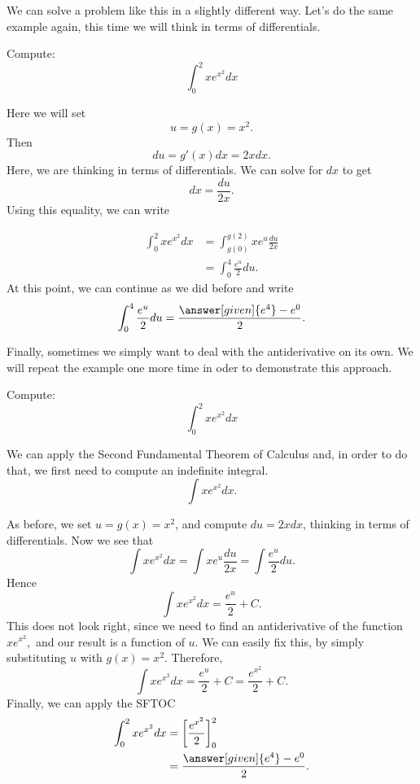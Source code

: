 \documentclass{ximera}
\begin{document}
We can solve a problem like this in a slightly different
way. Let's do the same example again, this time we will think in terms
of differentials.

\begin{example}\label{main example}
Compute:
\[
\int_0^2 x e^{x^2} dx
\]
\begin{explanation}
Here we will set
\[ u=g(x) = x^2.
\]
 Then 
 \[
 du =g'(x) dx=2x dx.
 \]
Here, we are thinking in terms of differentials.
We can solve for $dx$ to get 
\[
dx = \frac{du}{2x}.
\]
Using this equality, we can write

\begin{align*}
\int_0^2 x e^{x^2} dx &= \int_{g(0)}^{g(2)} x  e^{u} \frac{du}{2x}\\
  &= \int_{0}^{4} \frac{e^u}{2} du .
\end{align*}
At this point, we can continue as we did before and write
\[
 \int_{0}^{4} \frac{e^u}{2} du= \frac{\answer[given]{e^4} -e^0}{2}.
\]
\end{explanation}
\end{example}

Finally, sometimes we simply want to deal with the antiderivative on
its own.  We will repeat the example one more time in oder to demonstrate this approach.

\begin{example}
Compute:
\[
\int_0^2 x e^{x^2} dx
\]
\begin{explanation}
We can apply the Second Fundamental Theorem of Calculus and, in order to do that, we first need to compute an indefinite integral.
\[
\int  x e^{x^2}  dx.
\]

As before, we set $u=g(x)=x^2$, and compute $ du =  2x  dx$,
 thinking in terms of differentials. Now we see that
\[
\int   x e^{x^2} dx = \int x e^{u} \frac{du}{2x} = \int \frac{e^{u}}{2} du .
\]
Hence 
\[
\int  x e^{x^2} dx = \frac{e^{u}}{2}+C .
\]
This does not look right, since  we need to find an antiderivative of the function $ x e^{x^2},$ and our result is a function of $u$.
We can easily fix this, by simply substituting $u$ with $g(x)=x^2$.
Therefore,
\[
\int xe^{x^2} dx =\frac{e^{u}}{2}+C= \frac{e^{x^2}}{2}+C .
\]
Finally, we can apply the SFTOC
\begin{align*}
\int_0^2 x e^{x^2} dx &=\bigg[ \frac{e^{x^2}}{2} \bigg]_0^2\\
&= \frac{\answer[given]{e^4} -e^0}{2}.
\end{align*}
\end{explanation}
\end{example}
\end{document}
